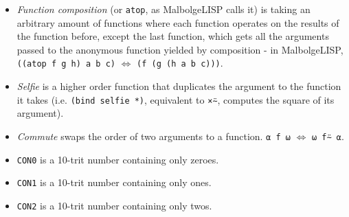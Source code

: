 \begin{itemize}
    \item \textit{Function composition} (or \verb|atop|, as MalbolgeLISP calls it) is taking an arbitrary amount of functions where each function operates on the results of the function before, except the last function, which gets all the arguments passed to the anonymous function yielded by composition - in MalbolgeLISP, \verb|((atop f g h) a b c)| $\iff$ \verb|(f (g (h a b c)))|.
    \item \textit{Selfie} is a higher order function that duplicates the argument to the function it takes (i.e. \verb|(bind selfie *)|, equivalent to \verb|×⍨|, computes the square of its argument).
    \item \textit{Commute} swaps the order of two arguments to a function. \verb|⍺ f ⍵| $\iff$ \verb|⍵ f⍨ ⍺|.
    \item \verb=CON0= is a 10-trit number containing only zeroes.
    \item \verb=CON1= is a 10-trit number containing only ones.
    \item \verb=CON2= is a 10-trit number containing only twos.
\end{itemize}
